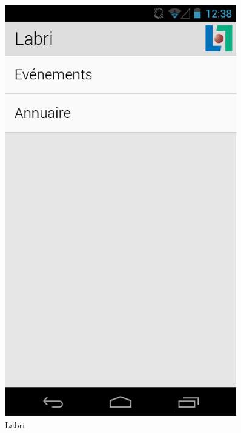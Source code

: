 \documentclass [pdftex,12pt] {report}
\begin{document}
\begin{figure}
  \centering
  \begin{minipage}[t]{8cm}
    \centering
    \includegraphics[width=0.9\textwidth]{resources/ui_preview/09}
    \caption{Labri}
    \label{fig:09}
  \end{minipage}
\end{figure}


\end{document}
